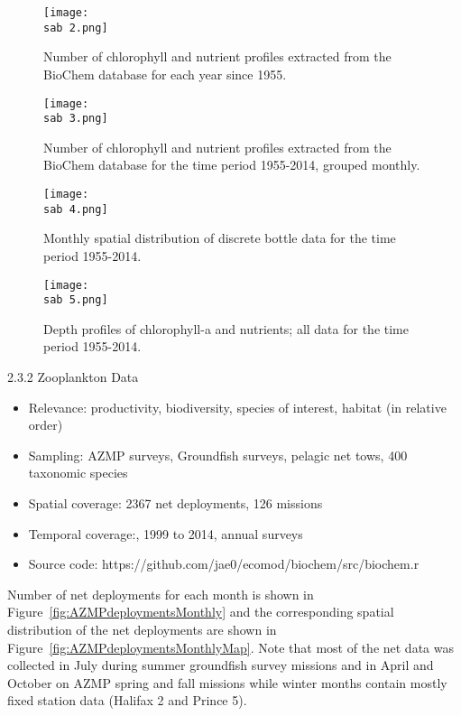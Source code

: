 \documentclass[letterpaper,portrait,11pt]{scrartcl}
\numberwithin{equation}{section}		%
\numberwithin{figure}{section}		%
\numberwithin{table}{section}				%
\newcommand{\ecomod}{\string~/ecomod_data/}   %
\newcommand{\sab}{\ecomod/mpa/sab/}   %
\begin{document}
\begin{figure}
  \label{fig:ChloroMap}
  \centering
  \texttt{[image: \\sab 2.png]}
  \caption{Number of chlorophyll and nutrient profiles extracted from the BioChem database for each year since 1955.}
\end{figure}

\begin{figure}
  \label{fig:ChloroFreq}
  \centering
  \texttt{[image: \\sab 3.png]}
  \caption{Number of chlorophyll and nutrient profiles extracted from the BioChem database for the time period 1955-2014, grouped monthly.}
\end{figure}

\begin{figure}[h]
  \label{fig:BottleMap}
  \centering
  \texttt{[image: \\sab 4.png]}
  \caption{Monthly spatial distribution of discrete bottle data for the time period 1955-2014.}
\end{figure}

\begin{figure}
  \label{fig:ChloroProfiles}
  \centering
  \texttt{[image: \\sab 5.png]}
  \caption{Depth profiles of chlorophyll-a and nutrients; all data for the time period 1955-2014.}
\end{figure}


2.3.2  Zooplankton Data

\begin{itemize}  
  \item Relevance:  productivity, biodiversity, species of interest, habitat (in relative order)
  \item Sampling:  AZMP surveys, Groundfish surveys, pelagic net tows, 400 taxonomic species
  \item Spatial coverage: 2367 net deployments, 126 missions 
  \item Temporal coverage:,  1999 to 2014, annual surveys
  \item Source code: https://github.com/jae0/ecomod/biochem/src/biochem.r
\end{itemize}

Number of net deployments for each month is shown in Figure~\ref{fig:AZMPdeploymentsMonthly} and the corresponding spatial distribution of the net deployments are shown in Figure~\ref{fig:AZMPdeploymentsMonthlyMap}. Note that most of the net data was collected in July during summer groundfish survey missions and in April and October on AZMP spring and fall missions while winter months contain mostly fixed station data (Halifax 2 and Prince 5).
\end{document}
